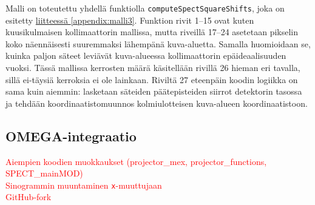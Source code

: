 Malli on toteutettu yhdellä funktiolla \texttt{computeSpectSquareShifts}, joka on esitetty \hyperref[appendix:malli3]{liitteessä \ref*{appendix:malli3}}. Funktion rivit 1--15 ovat kuten kuusikulmaisen kollimaattorin mallissa, mutta riveillä 17--24 asetetaan pikselin koko näennäisesti suuremmaksi lähempänä kuva-aluetta. Samalla huomioidaan se, kuinka paljon säteet leviävät kuva-alueessa kollimaattorin epäideaalisuuden vuoksi. Tässä mallissa kerrosten määrä käsitellään rivillä 26 hieman eri tavalla, sillä ei-täysiä kerroksia ei ole lainkaan. Riviltä 27 eteenpäin koodin logiikka on sama kuin aiemmin: lasketaan säteiden päätepisteiden siirrot detektorin tasossa ja tehdään koordinaatistomuunnos kolmiulotteisen kuva-alueen koordinaatistoon.

\subsection{OMEGA-integraatio}
\textcolor{red}{Aiempien koodien muokkaukset (projector\_mex, projector\_functions, SPECT\_mainMOD)}\\
\textcolor{red}{Sinogrammin muuntaminen \texttt{x}-muuttujaan}\\
\textcolor{red}{GitHub-fork}